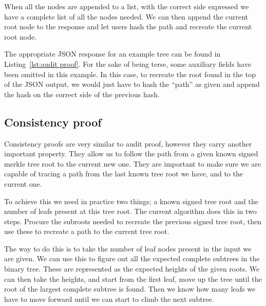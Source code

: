 \documentclass[../Main/thesis.tex]{subfiles}
\begin{document}
When all the nodes are appended to a list, with the correct side expressed we
have a complete list of all the nodes needed. We can then append the current
root node to the response and let users hash the path and recreate the current
root node.

The appropriate JSON response for an example tree can be found in
Listing~\ref{lst:audit proof}. For the sake of being terse, some auxiliary
fields have been omitted in this example. In this case, to recreate the root
found in the top of the JSON output, we would just have to hash the ``path'' as
given and append the hash on the correct side of the previous hash.



\subsection*{Consistency proof}%
\label{sub:consistency_proof_implementation}
Consistency proofs are very similar to audit proof, however they carry another
important property. They allow us to follow the path from a given known signed
merkle tree root to the current new one. They are important to make sure we are
capable of tracing a path from the last known tree root we have, and to the
current one. 

To achieve this we need in practice two things; a known signed tree root and the
number of leafs present at this tree root. The current algorithm does this in
two steps. Procure the subroots needed to recreate the previous signed tree
root, then use these to recreate a path to the current tree root. 

The way to do this is to take the number of leaf nodes present in the input we
are given. We can use this to figure out all the expected complete subtrees in
the binary tree. These are represented as the expected heights of the given
roots. We can then take the heights, and start from the first leaf, move up the
tree until the root of the largest complete subtree is found. Then we know how
many leafs we have to move forward until we can start to climb the next subtree.
\end{document}
